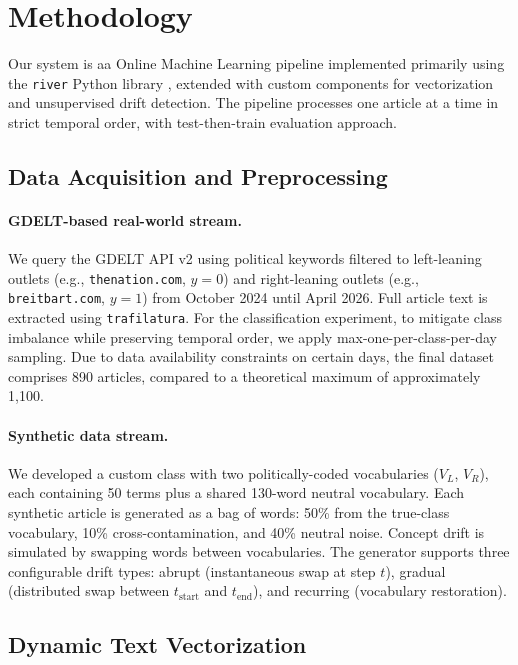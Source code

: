 \documentclass[
	a4paper,
	10pt,
	unnumberedsections,
	twoside,
]{LTJournalArticle}
\begin{document}

\section{Methodology}

Our system is aa Online Machine Learning pipeline implemented primarily using the \texttt{river} Python library \cite{montiel2021river}, extended with custom components for vectorization and unsupervised drift detection. The pipeline processes one article at a time in strict temporal order, with test-then-train evaluation approach.

\subsection{Data Acquisition and Preprocessing}

\paragraph{GDELT-based real-world stream.}
We query the GDELT API v2 using political keywords filtered to left-leaning outlets (e.g., \texttt{thenation.com}, $y=0$) and right-leaning outlets (e.g., \texttt{breitbart.com}, $y=1$) from October 2024 until April 2026. Full article text is extracted using \texttt{trafilatura}. For the classification experiment, to mitigate class imbalance while preserving temporal order, we apply max-one-per-class-per-day sampling. Due to data availability constraints on certain days, the final dataset comprises 890 articles, compared to a theoretical maximum of approximately 1,100.

\paragraph{Synthetic data stream.}
We developed a custom class with two politically-coded vocabularies ($V_L$, $V_R$), each containing 50 terms plus a shared 130-word neutral vocabulary. Each synthetic article is generated as a bag of words: 50\% from the true-class vocabulary, 10\% cross-contamination, and 40\% neutral noise. Concept drift is simulated by swapping words between vocabularies. The generator supports three configurable drift types: abrupt (instantaneous swap at step $t$), gradual (distributed swap between $t_{\text{start}}$ and $t_{\text{end}}$), and recurring (vocabulary restoration).

\subsection{Dynamic Text Vectorization}
\end{document}
